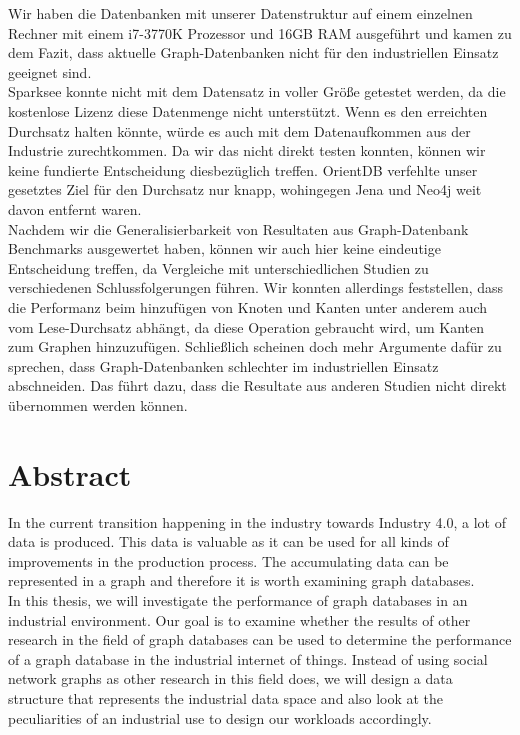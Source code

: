 Wir haben die Datenbanken mit unserer Datenstruktur auf einem einzelnen Rechner mit einem i7-3770K Prozessor und 16GB RAM ausgeführt und kamen zu dem Fazit,
dass aktuelle Graph-Datenbanken nicht für den industriellen Einsatz geeignet sind.\\
Sparksee konnte nicht mit dem Datensatz in voller Größe getestet werden,
da die kostenlose Lizenz diese Datenmenge nicht unterstützt.
Wenn es den erreichten Durchsatz halten könnte,
würde es auch mit dem Datenaufkommen aus der Industrie zurechtkommen.
Da wir das nicht direkt testen konnten,
können wir keine fundierte Entscheidung diesbezüglich treffen.
OrientDB verfehlte unser gesetztes Ziel für den Durchsatz nur knapp,
wohingegen Jena und Neo4j weit davon entfernt waren.\\
Nachdem wir die Generalisierbarkeit von Resultaten aus Graph-Datenbank Benchmarks ausgewertet haben,
können wir auch hier keine eindeutige Entscheidung treffen,
da Vergleiche mit unterschiedlichen Studien zu verschiedenen Schlussfolgerungen führen.
Wir konnten allerdings feststellen,
dass die Performanz beim hinzufügen von Knoten und Kanten unter anderem auch vom Lese-Durchsatz abhängt,
da diese Operation gebraucht wird,
um Kanten zum Graphen hinzuzufügen.
Schließlich scheinen doch mehr Argumente dafür zu sprechen,
dass Graph-Datenbanken schlechter im industriellen Einsatz abschneiden.
Das führt dazu,
dass die Resultate aus anderen Studien nicht direkt übernommen werden können.

\cleardoublepage

\chapter*{Abstract}

In the current transition happening in the industry towards Industry 4.0,
a lot of data is produced.
This data is valuable as it can be used for all kinds of improvements in the production process.
The accumulating data can be represented in a graph and therefore it is worth examining graph databases.\\
In this thesis,
we will investigate the performance of graph databases in an industrial environment.
Our goal is to examine whether the results of other research in the field of graph databases can be used to determine the performance of a graph database in the industrial internet of things.
Instead of using social network graphs as other research in this field does,
we will design a data structure that represents the industrial data space and also look at the peculiarities of an industrial use to design our workloads accordingly.

